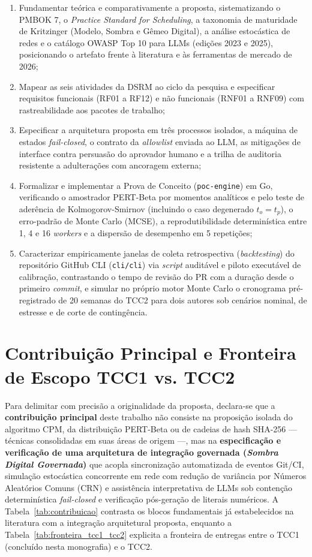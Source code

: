 \documentclass[12pt,openany,oneside,a4paper,english,brazilian,sumario=tradicional]{abntex2}
\begin{document}
\begin{enumerate}
  \item Fundamentar teórica e comparativamente a proposta, sistematizando o PMBOK 7, o \textit{Practice Standard for Scheduling}, a taxonomia de maturidade de Kritzinger (Modelo, Sombra e Gêmeo Digital), a análise estocástica de redes e o catálogo OWASP Top 10 para LLMs (edições 2023 e 2025), posicionando o artefato frente à literatura e às ferramentas de mercado de 2026;
  \item Mapear as seis atividades da DSRM \cite{peffers2007} ao ciclo da pesquisa e especificar requisitos funcionais (RF01 a RF12) e não funcionais (RNF01 a RNF09) com rastreabilidade aos pacotes de trabalho;
  \item Especificar a arquitetura proposta em três processos isolados, a máquina de estados \textit{fail-closed}, o contrato da \textit{allowlist} enviada ao LLM, as mitigações de interface contra persuasão do aprovador humano e a trilha de auditoria resistente a adulterações com ancoragem externa;
  \item Formalizar e implementar a Prova de Conceito (\texttt{poc-engine}) em Go, verificando o amostrador PERT-Beta por momentos analíticos e pelo teste de aderência de Kolmogorov-Smirnov (incluindo o caso degenerado $t_o=t_p$), o erro-padrão de Monte Carlo (MCSE), a reprodutibilidade determinística entre 1, 4 e 16 \textit{workers} e a dispersão de desempenho em 5 repetições;
  \item Caracterizar empiricamente janelas de coleta retrospectiva (\textit{back\-testing}) do repositório GitHub CLI (\texttt{cli/cli}) via \textit{script} auditável e piloto executável de calibração, contrastando o tempo de revisão do PR com a duração desde o primeiro \textit{commit}, e simular no próprio motor Monte Carlo o cronograma pré-registrado de 20 semanas do TCC2 para dois autores sob cenários nominal, de estresse e de corte de contingência.
\end{enumerate}

\section{Contribuição Principal e Fronteira de Escopo TCC1 vs. TCC2}\label{sec:contribuicao_escopo}

Para delimitar com precisão a originalidade da proposta, declara-se que a \textbf{contribuição principal} deste trabalho não consiste na proposição isolada do algoritmo CPM, da distribuição PERT-Beta ou de cadeias de hash SHA-256 — técnicas consolidadas em suas áreas de origem —, mas na \textbf{especificação e verificação de uma arquitetura de integração governada (\textit{Sombra Digital Governada})} que acopla sincronização automatizada de eventos Git/CI, simulação estocástica concorrente em rede com redução de variância por Números Aleatórios Comuns (CRN) e assistência interpretativa de LLMs sob contenção determinística \textit{fail-closed} e verificação pós-geração de literais numéricos. A Tabela~\ref{tab:contribuicao} contrasta os blocos fundamentais já estabelecidos na literatura com a integração arquitetural proposta, enquanto a Tabela~\ref{tab:fronteira_tcc1_tcc2} explicita a fronteira de entregas entre o TCC1 (concluído nesta monografia) e o TCC2.
\end{document}

